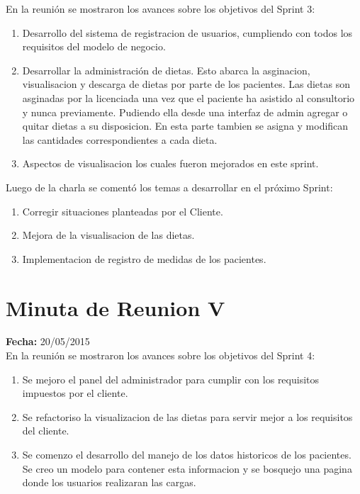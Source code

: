 \documentclass[runningheads,a4paper,spanish]{llncs}
\begin{document}
En la reunión se mostraron los avances sobre los objetivos del Sprint 3:
\begin{enumerate}
\item Desarrollo del sistema de registracion de usuarios, cumpliendo con todos los requisitos del modelo de negocio.  
\item Desarrollar la administración de dietas. Esto abarca la asginacion, visualisacion y descarga de dietas por parte de los pacientes. Las dietas son asginadas por la licenciada una vez que el paciente ha asistido al consultorio y nunca previamente. Pudiendo ella desde una interfaz de admin agregar o quitar dietas a su disposicion. En esta parte tambien se asigna y modifican las cantidades correspondientes a cada dieta.
\item Aspectos de visualisacion los cuales fueron mejorados en este sprint.
\end{enumerate}

\begin{flushleft}
Luego de la charla se comentó los temas a desarrollar en el próximo Sprint:
\end{flushleft}

\begin{enumerate}
	\item Corregir situaciones planteadas por el Cliente. 
	\item Mejora de la visualisacion de las dietas.
	\item Implementacion de registro de medidas de los pacientes. 
\end{enumerate}

\section{Minuta de Reunion V}

\textbf{Fecha: }20/05/2015\\

En la reunión se mostraron los avances sobre los objetivos del Sprint 4:
\begin{enumerate}
\item Se mejoro el panel del administrador para cumplir con los requisitos impuestos por el cliente.
\item Se refactoriso la visualizacion de las dietas para servir mejor a los requisitos del cliente.
\item Se comenzo el desarrollo del manejo de los datos historicos de los pacientes. Se creo un modelo para contener esta informacion y se bosquejo una pagina donde los usuarios realizaran las cargas.
\end{enumerate}
\end{document}
